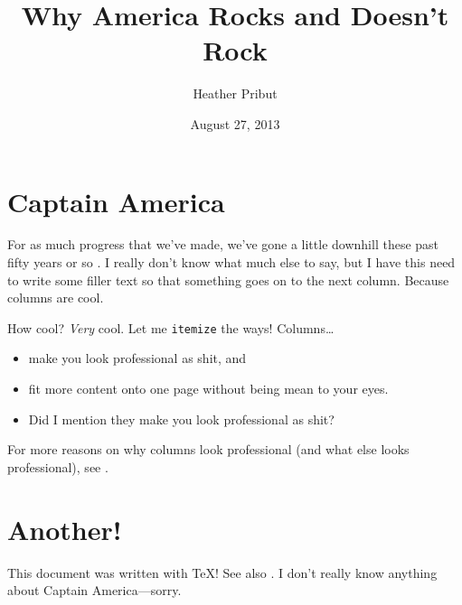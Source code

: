 \documentclass{biopaper}
\title{Why America Rocks and Doesn't Rock}
\author{Heather Pribut}
\date{August 27, 2013}
\begin{document}
\maketitle

\section{Captain America}
For as much progress that we've made,
  we've gone a little downhill
  these past fifty years or so \autocite{rogers:elements}.
I really don't know what much else to say,
  but I have this need to write some filler text
  so that something goes on to the next column.
Because columns are cool.

How cool?
\emph{Very} cool.
Let me \texttt{itemize} the ways!
Columns\dots
\begin{itemize}
\item make you look professional as shit, and
\item fit more content onto one page without being mean to your eyes.
\item Did I mention they make you look professional as shit?
\end{itemize}

For more reasons on why columns look professional
  (and what else looks professional),
  see \cite{compandtype}.

\section{Another!}
This document was written with \TeX! See also \cite{texbook}.
I don't really know anything about Captain America---sorry.

\printbibliography
\end{document}
